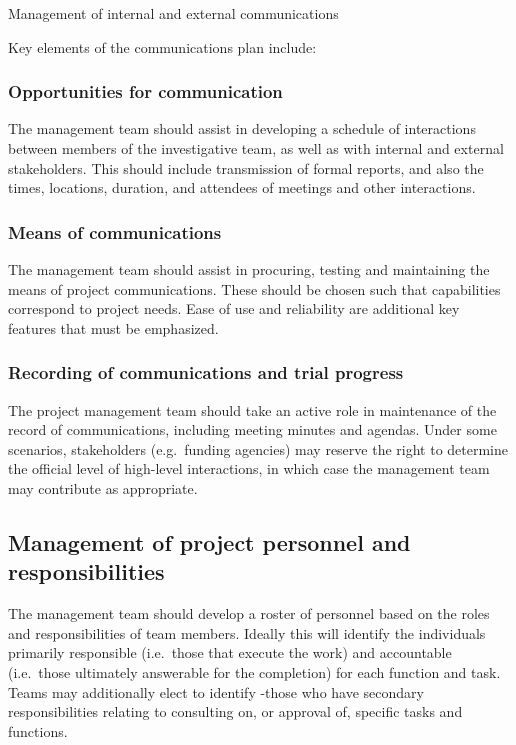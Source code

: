 \documentclass[]{book}
\theoremstyle{definition}
\theoremstyle{definition}
\theoremstyle{definition}
\theoremstyle{remark}
\begin{document}
Management of internal and external communications

Key elements of the communications plan include:

\subsubsection{Opportunities for
communication}\label{opportunities-for-communication}

The management team should assist in developing a schedule of
interactions between members of the investigative team, as well as with
internal and external stakeholders. This should include transmission of
formal reports, and also the times, locations, duration, and attendees
of meetings and other interactions.

\subsubsection{Means of communications}\label{means-of-communications}

The management team should assist in procuring, testing and maintaining
the means of project communications. These should be chosen such that
capabilities correspond to project needs. Ease of use and reliability
are additional key features that must be emphasized.

\subsubsection{Recording of communications and trial
progress}\label{recording-of-communications-and-trial-progress}

The project management team should take an active role in maintenance of
the record of communications, including meeting minutes and agendas.
Under some scenarios, stakeholders (e.g.~funding agencies) may reserve
the right to determine the official level of high-level interactions, in
which case the management team may contribute as appropriate.

\subsection{Management of project personnel and
responsibilities}\label{management-of-project-personnel-and-responsibilities}

The management team should develop a roster of personnel based on the
roles and responsibilities of team members. Ideally this will identify
the individuals primarily responsible (i.e.~those that execute the work)
and accountable (i.e.~those ultimately answerable for the completion)
for each function and task. Teams may additionally elect to identify
-those who have secondary responsibilities relating to consulting on, or
approval of, specific tasks and functions.
\end{document}
